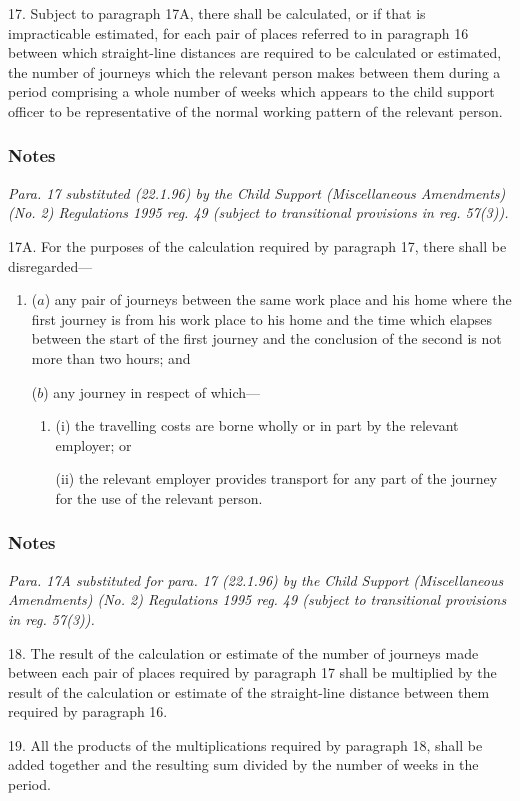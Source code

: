 \documentclass[a4paper]{article}
\newcommand\amendment[1]{\subsubsection*{Notes}{\itshape\frenchspacing\footnotesize #1 \par\goodbreak}}
\begin{document}

17.  Subject to paragraph 17A, there shall be calculated, or if that is impracticable estimated, for each pair of places referred to in paragraph 16 between which straight-line distances are required to be calculated or estimated, the number of journeys which the relevant person makes between them during a period comprising a whole number of weeks which appears to the child support officer to be representative of the normal working pattern of the relevant person.

\amendment{
Para. 17 substituted (22.1.96) by the Child Support (Miscellaneous Amendments) (No. 2) Regulations 1995 reg. 49 (subject to transitional provisions in reg. 57(3)).
}

\medskip

17A.  For the purposes of the calculation required by paragraph 17, there shall be disregarded—
\begin{enumerate}\item[]
($a$) any pair of journeys between the same work place and his home where the first journey is from his work place to his home and the time which elapses between the start of the first journey and the conclusion of the second is not more than two hours; and

($b$) any journey in respect of which—
\begin{enumerate}\item[]
(i) the travelling costs are borne wholly or in part by the relevant employer; or

(ii) the relevant employer provides transport for any part of the journey for the use of the relevant person.
\end{enumerate}
\end{enumerate}

\amendment{
Para. 17A substituted for para. 17 (22.1.96) by the Child Support (Miscellaneous Amendments) (No. 2) Regulations 1995 reg. 49 (subject to transitional provisions in reg. 57(3)).
}

\medskip

18.  The result of the calculation or estimate of the number of journeys made between each pair of places required by paragraph 17 shall be multiplied by the result of the calculation or estimate of the straight-line distance between them required by paragraph 16.

\medskip

19.  All the products of the multiplications required by paragraph 18, shall be added together and the resulting sum divided by the number of weeks in the period.
\end{document}
